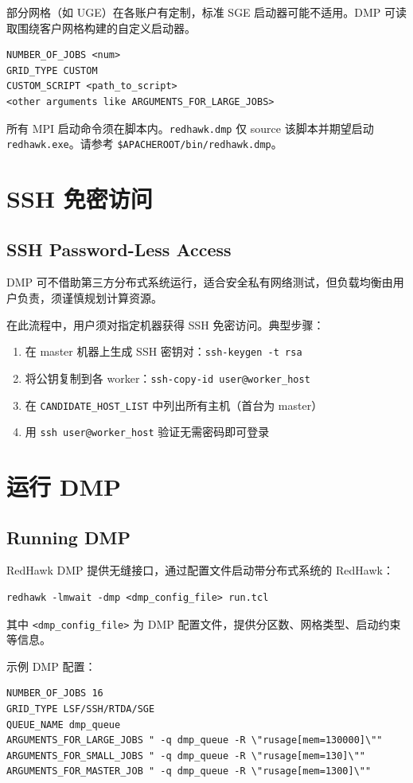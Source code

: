部分网格（如 UGE）在各账户有定制，标准 SGE 启动器可能不适用。DMP 可读取围绕客户网格构建的自定义启动器。

\begin{lstlisting}
NUMBER_OF_JOBS <num>
GRID_TYPE CUSTOM
CUSTOM_SCRIPT <path_to_script>
<other arguments like ARGUMENTS_FOR_LARGE_JOBS>
\end{lstlisting}

所有 MPI 启动命令须在脚本内。\texttt{redhawk.dmp} 仅 source 该脚本并期望启动 \texttt{redhawk.exe}。请参考 \texttt{\$APACHEROOT/bin/redhawk.dmp}。

\section{SSH 免密访问}
\subsection*{SSH Password-Less Access}

DMP 可不借助第三方分布式系统运行，适合安全私有网络测试，但负载均衡由用户负责，须谨慎规划计算资源。

在此流程中，用户须对指定机器获得 SSH 免密访问。典型步骤：
\begin{enumerate}
  \item 在 master 机器上生成 SSH 密钥对：\texttt{ssh-keygen -t rsa}
  \item 将公钥复制到各 worker：\texttt{ssh-copy-id user@worker\_host}
  \item 在 \texttt{CANDIDATE\_HOST\_LIST} 中列出所有主机（首台为 master）
  \item 用 \texttt{ssh user@worker\_host} 验证无需密码即可登录
\end{enumerate}

\section{运行 DMP}
\subsection*{Running DMP}

RedHawk DMP 提供无缝接口，通过配置文件启动带分布式系统的 RedHawk：
\begin{lstlisting}
redhawk -lmwait -dmp <dmp_config_file> run.tcl
\end{lstlisting}
其中 \texttt{<dmp\_config\_file>} 为 DMP 配置文件，提供分区数、网格类型、启动约束等信息。

示例 DMP 配置：
\begin{lstlisting}
NUMBER_OF_JOBS 16
GRID_TYPE LSF/SSH/RTDA/SGE
QUEUE_NAME dmp_queue
ARGUMENTS_FOR_LARGE_JOBS " -q dmp_queue -R \"rusage[mem=130000]\""
ARGUMENTS_FOR_SMALL_JOBS " -q dmp_queue -R \"rusage[mem=130]\""
ARGUMENTS_FOR_MASTER_JOB " -q dmp_queue -R \"rusage[mem=1300]\""
\end{lstlisting}

